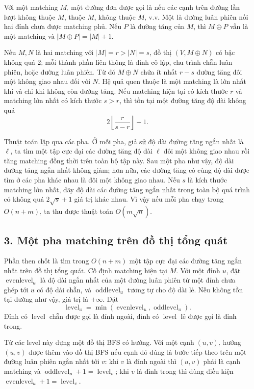 \documentclass[11pt]{article}
\begin{document}
Với một matching \(M\), một đường đơn được gọi là  nếu
các cạnh trên đường lần lượt không thuộc \(M\), thuộc \(M\), không thuộc
\(M\), v.v. Một  là đường luân phiên nối hai đỉnh chưa được
matching phủ. Nếu \(P\) là đường tăng của \(M\), thì \(M\oplus P\) vẫn là một
matching và \(|M\oplus P|=|M|+1\).

Nếu \(M,N\) là hai matching với \(|M|=r>|N|=s\), đồ thị
\((V,M\oplus N)\) có bậc không quá \(2\); mỗi thành phần liên thông là đỉnh cô
lập, chu trình chẵn luân phiên, hoặc đường luân phiên. Từ đó \(M\oplus N\)
chứa ít nhất \(r-s\) đường tăng đôi một không giao nhau đối với \(N\). Hệ quả
quen thuộc là một matching là lớn nhất khi và chỉ khi không còn đường tăng.
Nếu matching hiện tại có kích thước \(r\) và matching lớn nhất có kích thước
\(s>r\), thì tồn tại một đường tăng độ dài không quá
\[
  2\left\lfloor \frac{r}{s-r}\right\rfloor+1.
\]

Thuật toán lặp qua các pha. Ở mỗi pha, giả sử độ dài đường tăng ngắn nhất là
\(\ell\), ta tìm một tập cực đại các đường tăng độ dài \(\ell\) đôi một không
giao nhau rồi tăng matching đồng thời trên toàn bộ tập này. Sau một pha như
vậy, độ dài đường tăng ngắn nhất không giảm; hơn nữa, các đường tăng có cùng
độ dài được tìm ở các pha khác nhau là đôi một không giao nhau. Nếu \(s\) là
kích thước matching lớn nhất, dãy độ dài các đường tăng ngắn nhất trong toàn
bộ quá trình có không quá \(2\sqrt s+1\) giá trị khác nhau. Vì vậy nếu mỗi pha
chạy trong \(O(n+m)\), ta thu được thuật toán \(O(m\sqrt n)\).

\subsection*{3. Một pha matching trên đồ thị tổng quát}

Phần then chốt là tìm trong \(O(n+m)\) một tập cực đại các đường tăng ngắn nhất
trên đồ thị tổng quát. Cố định matching hiện tại \(M\). Với một đỉnh \(u\), đặt
\(\operatorname{evenlevel}_u\) là độ dài ngắn nhất của một đường luân phiên từ
một đỉnh chưa ghép tới \(u\) có độ dài chẵn, và
\(\operatorname{oddlevel}_u\) tương tự cho độ dài lẻ. Nếu không tồn tại đường
như vậy, giá trị là \(+\infty\). Đặt
\[
  \operatorname{level}_u
  =\min(\operatorname{evenlevel}_u,\operatorname{oddlevel}_u).
\]
Đỉnh có \(\operatorname{level}\) chẵn được gọi là đỉnh ngoài, đỉnh có
\(\operatorname{level}\) lẻ được gọi là đỉnh trong.

Từ các level này dựng một đồ thị BFS có hướng. Với một cạnh \((u,v)\), hướng
\((u,v)\) được thêm vào đồ thị BFS nếu cạnh đó đúng là bước tiếp theo trên một
đường luân phiên ngắn nhất tới \(v\): khi \(v\) là đỉnh ngoài thì \((u,v)\)
phải là cạnh matching và
\(\operatorname{oddlevel}_u+1=\operatorname{level}_v\); khi \(v\) là đỉnh
trong thì dùng điều kiện
\(\operatorname{evenlevel}_u+1=\operatorname{level}_v\).
\end{document}
